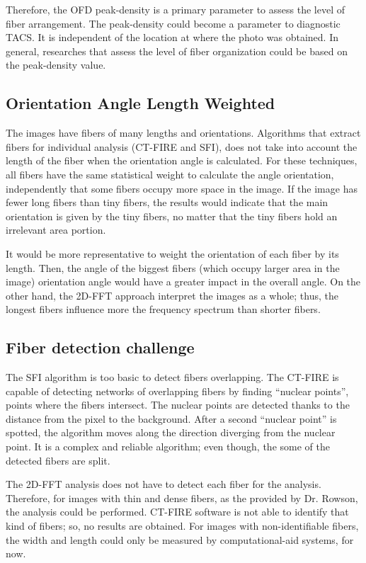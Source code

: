 \documentclass[12pt,a4paper]{article}
\begin{document}
Therefore, the OFD peak-density is a primary parameter to assess the level of fiber arrangement. The peak-density could become a parameter to diagnostic TACS.  It is independent of the location at where the photo was obtained. In general, researches that assess the level of fiber organization could be based on the peak-density value. 

\subsection{Orientation Angle Length Weighted}

The images have fibers of many lengths and orientations. Algorithms that extract fibers for individual analysis (CT-FIRE and SFI), does not take into account the length of the fiber when the orientation angle is calculated. For these techniques, all fibers have the same statistical weight to calculate the angle orientation, independently that some fibers occupy more space in the image. If the image has fewer long fibers than tiny fibers, the results would indicate that the main orientation is given by the tiny fibers, no matter that the tiny fibers hold an irrelevant area portion.
  
It would be more representative to weight the orientation of each fiber by its length. Then, the angle of the biggest fibers (which occupy larger area in the image) orientation angle would have a greater impact in the overall angle. On the other hand, the 2D-FFT approach interpret the images as a whole; thus, the longest fibers influence more the frequency spectrum than shorter fibers. 

\subsection{Fiber detection challenge}
The SFI algorithm is too basic to detect fibers overlapping. The CT-FIRE is capable of detecting networks of overlapping fibers by finding “nuclear points”, points where the fibers intersect. The nuclear points are detected thanks to the distance from the pixel to the background. After a second “nuclear point” is spotted, the algorithm moves along the direction diverging from the nuclear point. It is a complex and reliable algorithm; even though, the some of the detected fibers are split. 

The 2D-FFT analysis does not have to detect each fiber for the analysis. Therefore, for images with thin and dense fibers, as the provided by Dr. Rowson, the analysis could be performed. CT-FIRE software is not able to identify that kind of fibers; so, no results are obtained. For images with non-identifiable fibers, the width and length could only be measured by computational-aid systems, for now. 
\end{document}
